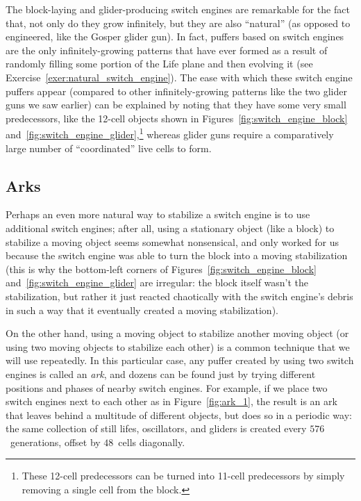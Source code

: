 The block-laying and glider-producing switch engines are remarkable for the fact that, not only do they grow infinitely, but they are also ``natural'' (as opposed to engineered, like the Gosper glider gun). In fact, puffers based on switch engines are the only infinitely-growing patterns that have ever formed as a result of randomly filling some portion of the Life plane and then evolving it (see Exercise~\ref{exer:natural_switch_engine}). The ease with which these switch engine puffers appear (compared to other infinitely-growing patterns like the two glider guns we saw earlier) can be explained by noting that they have some very small predecessors, like the 12-cell objects shown in Figures~\ref{fig:switch_engine_block} and~\ref{fig:switch_engine_glider},\footnote{These 12-cell predecessors can be turned into 11-cell predecessors by simply removing a single cell from the block.} whereas glider guns require a comparatively large number of ``coordinated'' live cells to form.


\subsection{Arks}\label{sec:arks}

Perhaps an even more natural way to stabilize a switch engine is to use additional switch engines; after all, using a stationary object (like a block) to stabilize a moving object seems somewhat nonsensical, and only worked for us because the switch engine was able to turn the block into a moving stabilization (this is why the bottom-left corners of Figures~\ref{fig:switch_engine_block} and~\ref{fig:switch_engine_glider} are irregular: the block itself wasn't the stabilization, but rather it just reacted chaotically with the switch engine's debris in such a way that it eventually created a moving stabilization).

On the other hand, using a moving object to stabilize another moving object (or using two moving objects to stabilize each other) is a common technique that we will use repeatedly. In this particular case, any puffer created by using two switch engines is called an \emph{ark}, and dozens can be found just by trying different positions and phases of nearby switch engines. For example, if we place two switch engines next to each other as in Figure~\ref{fig:ark_1}, the result is an ark that leaves behind a multitude of different objects, but does so in a periodic way: the same collection of still lifes, oscillators, and gliders is created every $576$~generations, offset by $48$~cells diagonally.

